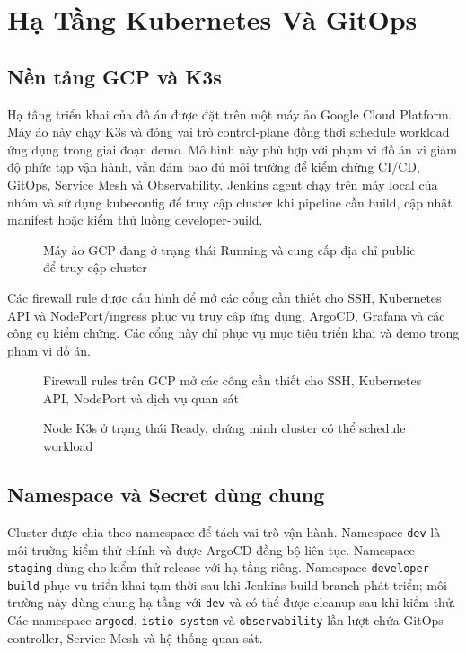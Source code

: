 \section{Hạ Tầng Kubernetes Và GitOps}

\subsection{Nền tảng GCP và K3s}

Hạ tầng triển khai của đồ án được đặt trên một máy ảo Google Cloud Platform. Máy ảo này chạy K3s và đóng vai trò control-plane đồng thời schedule workload ứng dụng trong giai đoạn demo. Mô hình này phù hợp với phạm vi đồ án vì giảm độ phức tạp vận hành, vẫn đảm bảo đủ môi trường để kiểm chứng CI/CD, GitOps, Service Mesh và Observability. Jenkins agent chạy trên máy local của nhóm và sử dụng kubeconfig để truy cập cluster khi pipeline cần build, cập nhật manifest hoặc kiểm thử luồng developer-build.

\begin{figure}[H]
\centering
{}
\caption{Máy ảo GCP đang ở trạng thái Running và cung cấp địa chỉ public để truy cập cluster}
\end{figure}

Các firewall rule được cấu hình để mở các cổng cần thiết cho SSH, Kubernetes API và NodePort/ingress phục vụ truy cập ứng dụng, ArgoCD, Grafana và các công cụ kiểm chứng. Các cổng này chỉ phục vụ mục tiêu triển khai và demo trong phạm vi đồ án.

\begin{figure}[H]
\centering
{}
\caption{Firewall rules trên GCP mở các cổng cần thiết cho SSH, Kubernetes API, NodePort và dịch vụ quan sát}
\end{figure}

\begin{figure}[H]
\centering
{}
\caption{Node K3s ở trạng thái Ready, chứng minh cluster có thể schedule workload}
\end{figure}

\subsection{Namespace và Secret dùng chung}

Cluster được chia theo namespace để tách vai trò vận hành. Namespace \texttt{dev} là môi trường kiểm thử chính và được ArgoCD đồng bộ liên tục. Namespace \texttt{staging} dùng cho kiểm thử release với hạ tầng riêng. Namespace \texttt{developer-build} phục vụ triển khai tạm thời sau khi Jenkins build branch phát triển; môi trường này dùng chung hạ tầng với \texttt{dev} và có thể được cleanup sau khi kiểm thử. Các namespace \texttt{argocd}, \texttt{istio-system} và \texttt{observability} lần lượt chứa GitOps controller, Service Mesh và hệ thống quan sát.

